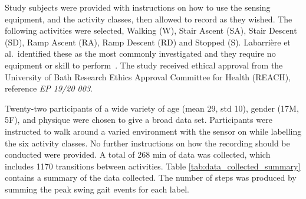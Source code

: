Study subjects were provided with instructions on how to use the sensing equipment, and the activity classes, then allowed to record as they wished. The following activities were selected, Walking (W), Stair Ascent (SA), Stair Descent (SD), Ramp Ascent (RA), Ramp Descent (RD) and Stopped (S). Labarri\`ere et al.~identified these as the most commonly investigated and they require no equipment or skill to perform~\cite{Labarriere2020}. The study received ethical approval from the University of Bath Research Ethics Approval Committee for Health (REACH), reference \textit{EP 19/20 003}.

Twenty-two participants of a wide variety of age (mean 29, std 10), gender (17M, 5F), and physique were chosen to give a broad data set. Participants were instructed to walk around a varied environment with the sensor on while labelling the six activity classes. No further instructions on how the recording should be conducted were provided. A total of 268 min  of data was collected, which includes 1170 transitions between activities. Table \ref{tab:data_collected_summary} contains a summary of the data collected. The number of steps was produced by summing the peak swing gait events for each label.

